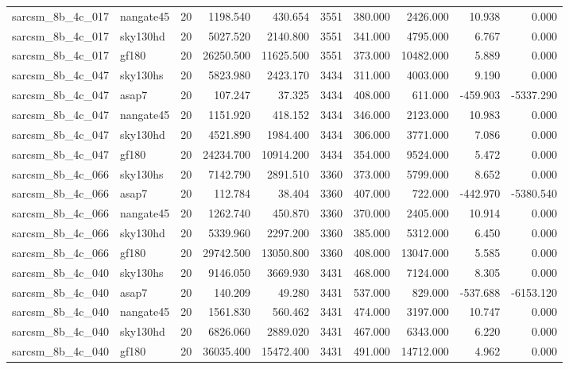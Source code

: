 \begin{longtable}{llrrrrrrrr}
sarcsm\_8b\_4c\_017 & nangate45 & 20 & 1198.540 & 430.654 & 3551 & 380.000 & 2426.000 & 10.938 & 0.000 \\
sarcsm\_8b\_4c\_017 & sky130hd & 20 & 5027.520 & 2140.800 & 3551 & 341.000 & 4795.000 & 6.767 & 0.000 \\
sarcsm\_8b\_4c\_017 & gf180 & 20 & 26250.500 & 11625.500 & 3551 & 373.000 & 10482.000 & 5.889 & 0.000 \\
sarcsm\_8b\_4c\_047 & sky130hs & 20 & 5823.980 & 2423.170 & 3434 & 311.000 & 4003.000 & 9.190 & 0.000 \\
sarcsm\_8b\_4c\_047 & asap7 & 20 & 107.247 & 37.325 & 3434 & 408.000 & 611.000 & -459.903 & -5337.290 \\
sarcsm\_8b\_4c\_047 & nangate45 & 20 & 1151.920 & 418.152 & 3434 & 346.000 & 2123.000 & 10.983 & 0.000 \\
sarcsm\_8b\_4c\_047 & sky130hd & 20 & 4521.890 & 1984.400 & 3434 & 306.000 & 3771.000 & 7.086 & 0.000 \\
sarcsm\_8b\_4c\_047 & gf180 & 20 & 24234.700 & 10914.200 & 3434 & 354.000 & 9524.000 & 5.472 & 0.000 \\
sarcsm\_8b\_4c\_066 & sky130hs & 20 & 7142.790 & 2891.510 & 3360 & 373.000 & 5799.000 & 8.652 & 0.000 \\
sarcsm\_8b\_4c\_066 & asap7 & 20 & 112.784 & 38.404 & 3360 & 407.000 & 722.000 & -442.970 & -5380.540 \\
sarcsm\_8b\_4c\_066 & nangate45 & 20 & 1262.740 & 450.870 & 3360 & 370.000 & 2405.000 & 10.914 & 0.000 \\
sarcsm\_8b\_4c\_066 & sky130hd & 20 & 5339.960 & 2297.200 & 3360 & 385.000 & 5312.000 & 6.450 & 0.000 \\
sarcsm\_8b\_4c\_066 & gf180 & 20 & 29742.500 & 13050.800 & 3360 & 408.000 & 13047.000 & 5.585 & 0.000 \\
sarcsm\_8b\_4c\_040 & sky130hs & 20 & 9146.050 & 3669.930 & 3431 & 468.000 & 7124.000 & 8.305 & 0.000 \\
sarcsm\_8b\_4c\_040 & asap7 & 20 & 140.209 & 49.280 & 3431 & 537.000 & 829.000 & -537.688 & -6153.120 \\
sarcsm\_8b\_4c\_040 & nangate45 & 20 & 1561.830 & 560.462 & 3431 & 474.000 & 3197.000 & 10.747 & 0.000 \\
sarcsm\_8b\_4c\_040 & sky130hd & 20 & 6826.060 & 2889.020 & 3431 & 467.000 & 6343.000 & 6.220 & 0.000 \\
sarcsm\_8b\_4c\_040 & gf180 & 20 & 36035.400 & 15472.400 & 3431 & 491.000 & 14712.000 & 4.962 & 0.000 \\

\end{longtable}
